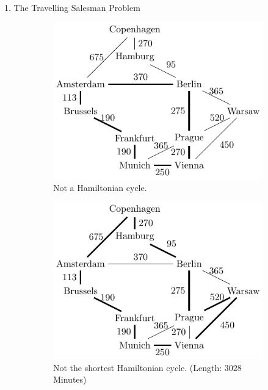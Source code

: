 \documentclass[]{templates/poster}
\begin{document}
\begin{frame}{}
\begin{columns}[t]
\begin{column}{0.422\linewidth}
\begin{block}{\Large 1. The Travelling Salesman Problem}
\begin{itemize}
  \begin{center}
  \begin{figure}
  \begin{subfigure}[t]{0.32\linewidth}
  \includegraphics[width=\linewidth]{not_hamiltonian}
  \caption{{\color{red}} Not a Hamiltonian cycle.}
  \end{subfigure}
  \begin{subfigure}[t]{0.32\linewidth}
  \includegraphics[width=\linewidth]{not_shortest}
  \caption{{\color{red}} Not the shortest Hamiltonian cycle. (Length: $3028$ Minutes)}
  \end{subfigure}
  \begin{subfigure}[t]{0.32\linewidth}

\end{subfigure}
\end{figure}
\end{center}
\end{itemize}
\end{block}
\end{column}
\end{columns}
\end{frame}
\end{document}
